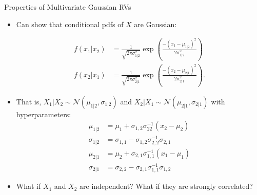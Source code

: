 \documentclass[handout,9pt]{beamer}
\begin{document}
%
\begin{frame}{Properties of Multivariate Gaussian RVs}

\begin{itemize}
\setlength{\itemsep}{10pt}
\item Can show that conditional pdfs of $X$ are Gaussian:
\begin{block}{}
\begin{align*}
f(x_1|x_2)&=\frac{1}{\sqrt{2\pi\sigma_{1|2}^2}}\exp \left({\frac{-(x_1-\mu_{1|2})^2}{2\sigma_{1|2}^2}}\right)\\
f(x_2|x_1)&=\frac{1}{\sqrt{2\pi\sigma_{2|1}^2}}\exp \left({\frac{-(x_2-\mu_{2|1})^2}{2\sigma_{2|1}^2}}\right).
\end{align*} 
\end{block}
\item That is, $X_1|X_2\sim \mathcal{N}(\mu_{1|2},\sigma_{1|2})$ and $X_2|X_1\sim \mathcal{N}(\mu_{2|1},\sigma_{2|1})$ with hyperparameters:
\begin{align*}
\mu_{1|2}&=\mu_1+\sigma_{1,2}\sigma_{22}^{-1}(x_2-\mu_2)\\
\sigma_{1|2}&=\sigma_{1,1}-\sigma_{1,2}\sigma_{2,2}^{-1}\sigma_{2,1}\\
\mu_{2|1}&=\mu_2+\sigma_{2,1}\sigma_{1,1}^{-1}(x_1-\mu_1)\\
\sigma_{2|1}&=\sigma_{2,2}-\sigma_{2,1}\sigma_{1,1}^{-1}\sigma_{1,2}
\end{align*}
\item What  if $X_1$ and $X_2$ are independent? What  if they are strongly correlated?
\end{itemize}

\end{frame}
\end{document}

